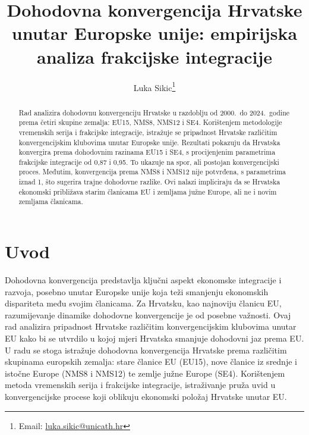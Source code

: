 \documentclass{crebsshr}
\begin{document}

\title{Dohodovna konvergencija Hrvatske unutar Europske unije: empirijska analiza frakcijske integracije}

\author[L. Sikic]{Luka Sikic\thanks{Email: \href{mailto:luka.sikic@unicath.hr}{luka.sikic@unicath.hr}}}
\address{ Croatian Catholic University, Ilica 242, Zagreb, 10000, Croatia}


\begin{abstract}
 Rad analizira dohodovnu konvergenciju Hrvatske u razdoblju od 2000.\ do 2024.\ godine prema četiri skupine zemalja: EU15, NMS8, NMS12 i SE4. Korištenjem metodologije vremenskih serija i frakcijske integracije, istražuje se pripadnost Hrvatske različitim konvergencijskim klubovima unutar Europske unije. Rezultati pokazuju da Hrvatska konvergira prema dohodovnim razinama EU15 i SE4, s procijenjenim parametrima frakcijske integracije od 0,87 i 0,95. To ukazuje na spor, ali postojan konvergencijski proces. Međutim, konvergencija prema NMS8 i NMS12 nije potvrđena, s parametrima iznad 1, što sugerira trajne dohodovne razlike. Ovi nalazi impliciraju da se Hrvatska ekonomski približava starim članicama EU i zemljama južne Europe, ali ne i novim zemljama članicama. 
\end{abstract}

\maketitle
\bigskip


\section{Uvod}Dohodovna konvergencija predstavlja ključni aspekt ekonomske integracije i razvoja, posebno unutar Europske unije koja teži smanjenju ekonomskih dispariteta među svojim članicama. Za Hrvatsku, kao najnoviju članicu EU, razumijevanje dinamike dohodovne konvergencije je od posebne važnosti. Ovaj rad analizira pripadnost Hrvatske različitim konvergencijskim klubovima unutar EU kako bi se utvrdilo u kojoj mjeri Hrvatska smanjuje dohodovni jaz prema EU. U radu se stoga istražuje  dohodovna konvergencija Hrvatske prema različitim skupinama europskih zemalja: stare članice EU (EU15), nove članice iz srednje i istočne Europe (NMS8 i NMS12) te zemlje južne Europe (SE4). Korištenjem metoda vremenskih serija i frakcijske integracije, istraživanje pruža uvid u konvergencijske procese koji oblikuju ekonomski položaj Hrvatske unutar EU.
\end{document}
